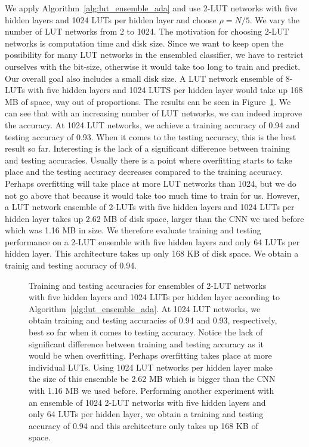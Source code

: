 \noindent We apply Algorithm~\ref{alg:lut_ensemble_ada} and use 2-LUT networks with five hidden layers and 1024 LUTs per hidden layer and choose $\rho = N/5$. We vary the number of LUT networks from 2 to 1024. The motivation for choosing 2-LUT networks is computation time and disk size. Since we want to keep open the possibility for many LUT networks in the ensembled classifier, we have to restrict ourselves with the bit-size, otherwise it would take too long to train and predict. Our overall goal also includes a small disk size. A LUT network ensemble of 8-LUTs with five hidden layers and 1024 LUTS per hidden layer would take up 168 MB of space, way out of proportions. The results can be seen in Figure~\ref{fig:ada_2_LUT}. We can see that with an increasing number of LUT networks, we can indeed improve the accuracy. At 1024 LUT networks, we achieve a training accuracy of 0.94 and testing accuracy of 0.93. When it comes to the testing accuracy, this is the best result so far. Interesting is the lack of a significant difference between training and testing accuracies. Usually there is a point where overfitting starts to take place and the testing accuracy decreases compared to the training accuracy. Perhaps overfitting will take place at more LUT networks than 1024, but we do not go above that because it would take too much time to train for us. However, a LUT network ensemble of 2-LUTs with five hidden layers and 1024 LUTs per hidden layer takes up 2.62 MB of disk space, larger than the CNN we used before which was 1.16 MB in size. We therefore evaluate training and testing performance on a 2-LUT ensemble with five hidden layers and only 64 LUTs per hidden layer. This architecture takes up only 168 KB of disk space. We obtain a trainig and testing accuracy of 0.94.

\begin{figure}[!htb]
    \centering
    
    \caption{Training and testing accuracies for ensembles of 2-LUT networks with five hidden layers and 1024 LUTs per hidden layer according to Algorithm~\ref{alg:lut_ensemble_ada}. At 1024 LUT networks, we obtain training and testing accuracies of 0.94 and 0.93, respectively, best so far when it comes to testing accuracy. Notice the lack of significant difference between training and testing accuracy as it would be when overfitting. Perhaps overfitting takes place at more individual LUTs. Using 1024 LUT networks per hidden layer make the size of this ensemble be 2.62 MB which is bigger than the CNN with 1.16 MB we used before. Performing another experiment with an ensemble of 1024 2-LUT networks with five hidden layers and only 64 LUTs per hidden layer, we obtain a training and testing accuracy of 0.94 and this architecture only takes up 168 KB of space.}
\label{fig:ada_2_LUT}
\end{figure}
\FloatBarrier

